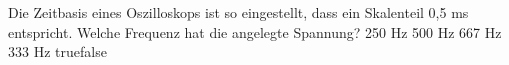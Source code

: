     {Die Zeitbasis eines Oszilloskops ist so eingestellt, dass ein Skalenteil 0,5 ms entspricht. Welche Frequenz hat die angelegte Spannung? }
    {250 Hz}
    {500 Hz}
    {667 Hz}
    {333 Hz}
    {true}{false}